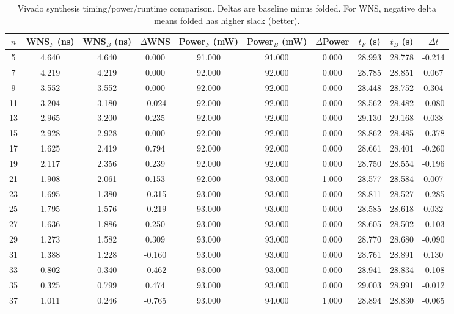 \begin{table}[t]
\centering
\scriptsize
\setlength{\tabcolsep}{3.6pt}
\renewcommand{\arraystretch}{1.05}
\caption{Vivado synthesis timing/power/runtime comparison. Deltas are baseline minus folded. For WNS, negative delta means folded has higher slack (better).}
\label{tab:vivado_timing_runtime}
\begin{tabular}{cccccccccc}
\hline
$n$ & WNS$_F$ (ns) & WNS$_B$ (ns) & $\Delta$WNS & Power$_F$ (mW) & Power$_B$ (mW) & $\Delta$Power & $t_F$ (s) & $t_B$ (s) & $\Delta t$ \\
\hline
5 & 4.640 & 4.640 & 0.000 & 91.000 & 91.000 & 0.000 & 28.993 & 28.778 & -0.214 \\
7 & 4.219 & 4.219 & 0.000 & 92.000 & 92.000 & 0.000 & 28.785 & 28.851 & 0.067 \\
9 & 3.552 & 3.552 & 0.000 & 92.000 & 92.000 & 0.000 & 28.448 & 28.752 & 0.304 \\
11 & 3.204 & 3.180 & -0.024 & 92.000 & 92.000 & 0.000 & 28.562 & 28.482 & -0.080 \\
13 & 2.965 & 3.200 & 0.235 & 92.000 & 92.000 & 0.000 & 29.130 & 29.168 & 0.038 \\
15 & 2.928 & 2.928 & 0.000 & 92.000 & 92.000 & 0.000 & 28.862 & 28.485 & -0.378 \\
17 & 1.625 & 2.419 & 0.794 & 92.000 & 92.000 & 0.000 & 28.661 & 28.401 & -0.260 \\
19 & 2.117 & 2.356 & 0.239 & 92.000 & 92.000 & 0.000 & 28.750 & 28.554 & -0.196 \\
21 & 1.908 & 2.061 & 0.153 & 92.000 & 93.000 & 1.000 & 28.577 & 28.584 & 0.007 \\
23 & 1.695 & 1.380 & -0.315 & 93.000 & 93.000 & 0.000 & 28.811 & 28.527 & -0.285 \\
25 & 1.795 & 1.576 & -0.219 & 93.000 & 93.000 & 0.000 & 28.585 & 28.618 & 0.032 \\
27 & 1.636 & 1.886 & 0.250 & 93.000 & 93.000 & 0.000 & 28.605 & 28.502 & -0.103 \\
29 & 1.273 & 1.582 & 0.309 & 93.000 & 93.000 & 0.000 & 28.770 & 28.680 & -0.090 \\
31 & 1.388 & 1.228 & -0.160 & 93.000 & 93.000 & 0.000 & 28.761 & 28.891 & 0.130 \\
33 & 0.802 & 0.340 & -0.462 & 93.000 & 93.000 & 0.000 & 28.941 & 28.834 & -0.108 \\
35 & 0.325 & 0.799 & 0.474 & 93.000 & 93.000 & 0.000 & 29.003 & 28.991 & -0.012 \\
37 & 1.011 & 0.246 & -0.765 & 93.000 & 94.000 & 1.000 & 28.894 & 28.830 & -0.065 \\

\end{tabular}
\end{table}
